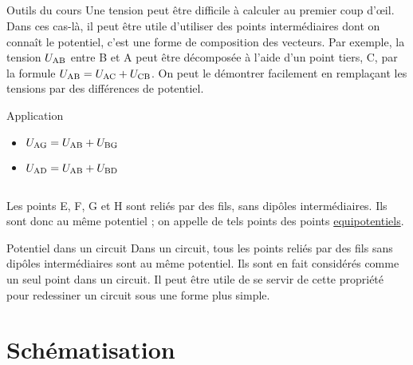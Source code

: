 \documentclass[10pt,a5paper,notitlepage]{book}
\begin{document}
\subsection{}
\begin{NCdemo}{Outils du cours}
    Une tension peut être difficile à calculer au premier coup d'œil. Dans
    ces cas-là, il peut être utile d'utiliser des points intermédiaires dont on
    connaît le potentiel, c'est une forme de composition des vecteurs. Par
    exemple, la tension $U_{\rm AB}$ entre B et A peut être décomposée à l'aide
    d'un point tiers, C, par la formule $U_{\rm AB} = U_{\rm AC} + U_{\rm CB}$.
    On peut le démontrer facilement en remplaçant les tensions par des
    différences de potentiel.
\end{NCdemo}

\begin{NCexem}{Application}
    \begin{itemize}
        \item $U_{\rm AG} = U_{\rm AB} + U_{\rm BG}$
        \item $U_{\rm AD} = U_{\rm AB} + U_{\rm BD}$
    \end{itemize}
\end{NCexem}

\subsection{}
Les points E, F, G et H sont reliés par des fils, sans dipôles intermédiaires.
Ils sont donc au même potentiel ; on appelle de tels points des points
\underline{equipotentiels}.

\begin{impo}{Potentiel dans un circuit}\label{def:potentiel}
    Dans un circuit, tous les points reliés par des fils sans dipôles
    intermédiaires sont au même potentiel. Ils sont en fait considérés comme un
    seul point dans un circuit. Il peut être utile de se servir de cette
    propriété pour redessiner un circuit sous une forme plus simple.
\end{impo}

\section{Schématisation}
\end{document}
